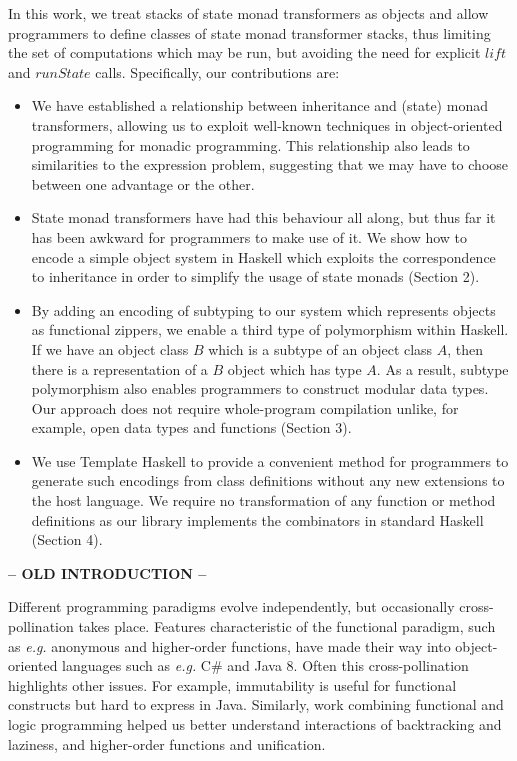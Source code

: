 In this work, we treat stacks of state monad transformers as objects and allow programmers to define classes of state monad transformer stacks, thus limiting the set of computations which may be run, but avoiding the need for explicit $\mathit{lift}$ and $\mathit{runState}$ calls. Specifically, our contributions are:
\begin{itemize}
    \item We have established a relationship between inheritance and (state) monad transformers, allowing us to exploit well-known techniques in object-oriented programming for monadic programming. This relationship also leads to similarities to the expression problem, suggesting that we may have to choose between one advantage or the other.
    \item State monad transformers have had this behaviour all along, but thus far it has been awkward for programmers to make use of it. We show how to encode a simple object system in Haskell which exploits the correspondence to inheritance in order to simplify the usage of state monads (Section 2).
    \item By adding an encoding of subtyping to our system which represents objects as functional zippers, we enable a third type of polymorphism within Haskell. If we have an object class $B$ which is a subtype of an object class $A$, then there is a representation of a $B$ object which has type $A$. As a result, subtype polymorphism also enables programmers to construct modular data types. Our approach does not require whole-program compilation unlike, for example, open data types and functions \cite{loh2006open} (Section 3).
    \item We use Template Haskell to provide a convenient method for programmers to generate such encodings from class definitions without any new extensions to the host language. We require no transformation of any function or method definitions as our library implements the combinators in standard Haskell (Section 4).
\end{itemize}

\textbf{-- OLD INTRODUCTION --}

Different programming paradigms evolve independently, but occasionally cross-pollination takes place. Features characteristic of the functional paradigm, such as \emph{e.g.} anonymous and higher-order functions, have made their way into object-oriented languages such as \emph{e.g.} C\# and Java 8. Often this cross-pollination highlights other issues. For example, immutability is useful for functional constructs but hard to express in Java. Similarly, work combining functional and logic programming \citep{nadathur1988overview,hanus2006curry,somogyi1996execution} helped us better understand interactions of backtracking and laziness, and higher-order functions and unification.

